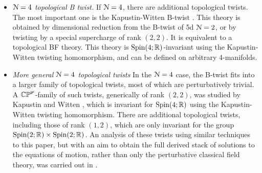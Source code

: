 \documentclass[10pt, oneside]{article}
\begin{document}
\begin{itemize}
 \item \emph{$\mathcal{N}=4$ topological B twist.} If $\mathcal{N}=4$, there are additional topological twists.  The most important one is the Kapustin-Witten B-twist \cite{KapustinWitten}.  This theory is obtained by dimensional reduction from the B-twist of 5d $\mathcal{N}=2$, or by twisting by a special supercharge of rank $(2,2)$.  It is equivalent to a topological BF theory.  This theory is $\mathrm{Spin}(4;\mathbb R)$-invariant using the Kapustin-Witten twisting homomorphism, and can be defined on arbitrary 4-manifolds.
 \item \emph{More general $\mathcal{N}=4$ topological twists} In the $\mathcal{N}=4$ case, the B-twist fits into a larger family of topological twists, most of which are perturbatively trivial.  A $\mathbb{CP^1}$-family of such twists, generically of rank $(2,2)$, was studied by Kapustin and Witten \cite{KapustinWitten}, which is invariant for $\mathrm{Spin}(4;\mathbb R)$ using the Kapustin-Witten twisting homomorphism.  There are additional topological twists, including those of rank $(1,2)$, which are only invariant for the group $\mathrm{Spin}(2;\mathbb R) \times \mathrm{Spin}(2;\mathbb R)$.  An analysis of these twists using similar techniques to this paper, but with an aim to obtain the full derived stack of solutions to the equations of motion, rather than only the perturbative classical field theory, was carried out in \cite{ElliottYoo1}.
\end{itemize}
\end{document}

